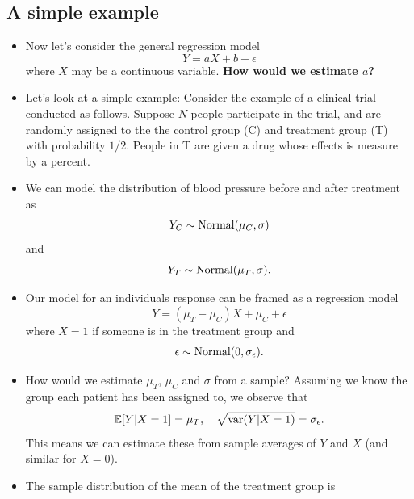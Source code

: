 \subsection{A simple example}
\begin{itemize}
\item Now let's consider the general regression model
\begin{equation}
Y = aX + b + \epsilon 
\end{equation}
where $X$ may be a continuous variable. 
{\bf How would we estimate $a$? }
\item Let's look at a simple example: 
Consider the example of a clinical trial conducted as follows. Suppose $N$ people participate in the trial, and are randomly assigned to the the control group (C) and treatment group (T) with probability $1/2$. People in T are given a drug whose effects is measure by a percent.  
\item We can model the distribution of blood pressure before and after treatment as 
\begin{equation}
Y_C \sim {\rm Normal}(\mu_C,\sigma)
\end{equation}
and 
\begin{equation}
Y_T \sim {\rm Normal}(\mu_T,\sigma).
\end{equation}
\item Our model for an individuals response can be framed as a regression model 
\begin{equation}\label{eq:clinical}
Y  = (\mu_T-\mu_C)X + \mu_C + \epsilon
\end{equation}
where $X=1$ if someone is in the treatment group and 
\begin{equation}
\epsilon \sim {\rm Normal}(0,\sigma_{\epsilon}). 
\end{equation}
\item How would we estimate $\mu_T$, $\mu_C$ and $\sigma$ from a sample? Assuming we know the group each patient has been assigned to, we observe that 
\begin{equation}
\mathbb E[Y|X=1] = \mu_T,\quad  \sqrt{{\rm var}(Y|X=1)} = \sigma_{\epsilon}. 
\end{equation}
This means we can estimate these from sample averages of $Y$ and $X$ (and similar for $X=0$).
\item The sample distribution of the mean of the treatment group is

\end{itemize}
